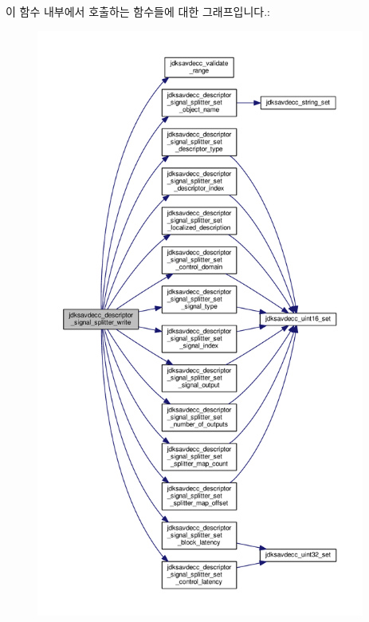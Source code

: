 이 함수 내부에서 호출하는 함수들에 대한 그래프입니다.\+:
\nopagebreak
\begin{figure}[H]
\begin{center}
\leavevmode
\includegraphics[height=550pt]{group__descriptor__signal__splitter_gad4d100f9c484b57f263df0f9020d625a_cgraph}
\end{center}
\end{figure}


